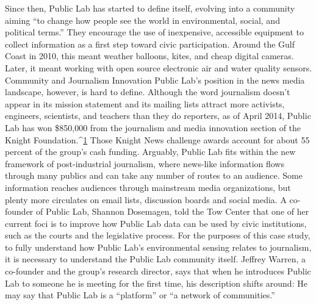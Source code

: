 Since then, Public Lab has started to define itself, evolving into a community
aiming ``to change how people see the world in environmental, social,
and political terms.'' They encourage the use of inexpensive, accessible
equipment to collect information as a first step toward civic participation.
Around the Gulf Coast in 2010, this meant weather balloons, kites, and
cheap digital cameras. Later, it meant working with open source electronic
air and water quality sensors.
Community and Journalism Innovation
Public Lab's position in the news media landscape, however, is hard to define.
Although the word journalism doesn't appear in its mission statement and
its mailing lists attract more activists, engineers, scientists, and teachers
than they do reporters, as of April 2014, Public Lab has won \$850,000 from
the journalism and media innovation section of the Knight Foundation.^{\href{#endnotes-public-lab}{1}}
Those Knight News challenge awards account for about 55 percent of the
group's cash funding. Arguably, Public Lab fits within the new framework of
post-industrial journalism, where news-like information flows through
many publics and can take any number of routes to an audience. Some information
reaches audiences through mainstream media organizations, but
plenty more circulates on email lists, discussion boards and social media. A
co-founder of Public Lab, Shannon Dosemagen, told the Tow Center that
one of her current foci is to improve how Public Lab data can be used by civic
institutions, such as the courts and the legislative process.
For the purposes of this case study, to fully understand how Public Lab's
environmental sensing relates to journalism, it is necessary to understand
the Public Lab community itself. Jeffrey Warren, a co-founder and
the group's research director, says that when he introduces Public Lab to
someone he is meeting for the first time, his description shifts around:
He may say that Public Lab is a ``platform'' or ``a network of communities.''

